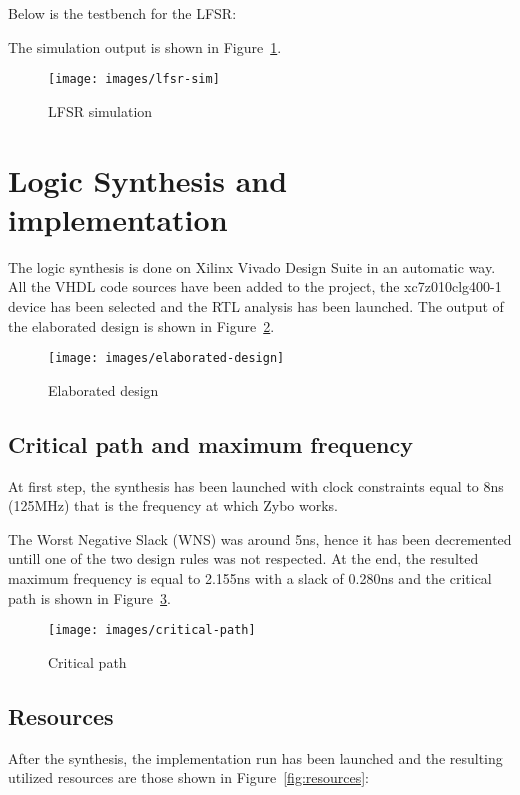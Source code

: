 \documentclass[11pt,a4paper,oneside, openright]{article}
\begin{document}
Below is the testbench for the LFSR:



The simulation output is shown in Figure~\ref{fig:lfsr-sim}.

\begin{figure}[h]
    \centering
    \texttt{[image: images/lfsr-sim]}
    \caption{LFSR simulation}
    \label{fig:lfsr-sim}
\end{figure}

\newpage

\section{Logic Synthesis and implementation}
The logic synthesis is done on Xilinx Vivado Design Suite in an automatic way. All the VHDL code sources have been added to the project, the xc7z010clg400-1 device has been selected and the RTL analysis has been launched. The output of the elaborated design is shown in Figure~\ref{fig:elaborated-design}.

\begin{figure}[h]
    \centering
    \texttt{[image: images/elaborated-design]}
    \caption{Elaborated design}
    \label{fig:elaborated-design}
\end{figure}

\subsection{Critical path and maximum frequency}
At first step, the synthesis has been launched with clock constraints equal to 8ns (125MHz) that is the frequency at which Zybo works.

The Worst Negative Slack (WNS) was around 5ns, hence it has been decremented untill one of the two design rules was not respected. At the end, the resulted maximum frequency is equal to 2.155ns with a slack of 0.280ns and the critical path is shown in Figure~\ref{fig:critical-path}.

\begin{figure}[h]
    \centering
    \texttt{[image: images/critical-path]}
    \caption{Critical path}
    \label{fig:critical-path}
\end{figure}


\subsection{Resources}
After the synthesis, the implementation run has been launched and the resulting utilized resources are those shown in Figure~\ref{fig:resources}:
\end{document}
